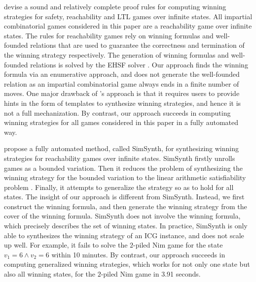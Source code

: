 \documentclass[review]{elsarticle}
\begin{document}
\citet{BeyCPR2014} devise a sound and relatively complete proof rules for computing winning strategies for safety, reachability and LTL games over infinite states.
All impartial combinatorial games considered in this paper are a reachability game over infinite states.
The rules for reachability games rely on winning formulas and well-founded relations that are used to guarantee the correctness and termination of the winning strategy respectively.
The generation of winning formulas and well-founded relations is solved by the EHSF solver \cite{BeyPR2013}.
Our approach finds the winning formula via an enumerative approach, and does not generate the well-founded relation as an impartial combinatorial game always ends in a finite number of moves.
One major drawback of \citeauthor{BeyCPR2014}'s approach is that it requires users to provide hints in the form of templates to synthesize winning strategies, and hence it is not a full mechanization.
By contrast, our approach succeeds in computing winning strategies for all games considered in this paper in a fully automated way.

\citet{FarK2018} propose a fully automated method, called SimSynth, for synthesizing winning strategies for reachability games over infinite states.
SimSynth firstly unrolls games as a bounded variation.
Then it reduces the problem of synthesizing the winning strategy for the bounded variation to the linear arithmetic satisfiability problem \cite{FarK2016}.
Finally, it attempts to generalize the strategy so as to hold for all states.
The insight of our approach is different from SimSynth.
Instead, we first construct the winning formula, and then generate the winning strategy from the cover of the winning formula.
SimSynth does not involve the winning formula, which precisely describes the set of winning states.
In practice, SimSynth is only able to synthesizes the winning strategy of an ICG instance, and does not scale up well.
For example, it fails to solve the $2$-piled Nim game for the state $v_1 = 6 \land v_2 = 6$ within 10 minutes.
By contrast, our approach succeeds in computing generalized winning strategies, which works for not only one state but also all winning states, for the $2$-piled Nim game in 3.91 seconds.
\end{document}
